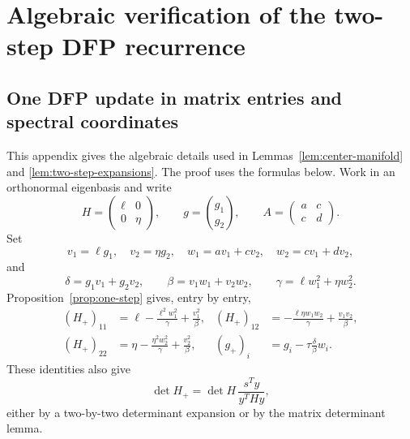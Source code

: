 \documentclass[11pt]{article}
\begin{document}
\appendix

\section{Algebraic verification of the two-step DFP recurrence}
\label{app:algebra}

\subsection{One DFP update in matrix entries and spectral coordinates}

This appendix gives the algebraic details used in
Lemmas~\ref{lem:center-manifold} and \ref{lem:two-step-expansions}.  The proof
uses the formulas below.  Work in an orthonormal eigenbasis and write
\[
H=\begin{pmatrix}\ell&0\\0&\eta\end{pmatrix},\qquad
g=\binom{g_1}{g_2},\qquad
A=\begin{pmatrix}a&c\\c&d\end{pmatrix}.
\]
Set
\[
v_1=\ell g_1,\quad v_2=\eta g_2,\quad
w_1=av_1+cv_2,\quad w_2=cv_1+dv_2,
\]
and
\[
\delta=g_1v_1+g_2v_2,\qquad
\beta=v_1w_1+v_2w_2,
\qquad \gamma=\ell w_1^2+\eta w_2^2.
\]
Proposition~\ref{prop:one-step} gives, entry by entry,
\begin{align}
(H_+)_{11}&=\ell-\frac{\ell^2w_1^2}{\gamma}
                    +\frac{v_1^2}{\beta},
&
(H_+)_{12}&=-\frac{\ell\eta w_1w_2}{\gamma}
                    +\frac{v_1v_2}{\beta},
\label{eq:appendix-H-entries}\\
(H_+)_{22}&=\eta-\frac{\eta^2w_2^2}{\gamma}
                    +\frac{v_2^2}{\beta},
&
(g_+)_i&=g_i-\tau\frac{\delta}{\beta}w_i.
\nonumber
\end{align}
These identities also give
\begin{equation}\label{eq:dfp-determinant}
\det H_+=\det H\,\frac{s^Ty}{y^THy},
\end{equation}
either by a two-by-two determinant expansion or by the matrix determinant
lemma.
\end{document}

